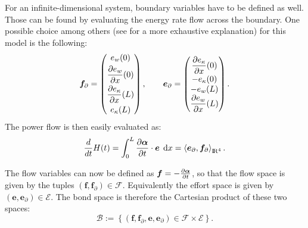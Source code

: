 \documentclass[11pt]{article}
\begin{document}
	For an infinite-dimensional system, boundary variables have to be defined as well. Those can be found by evaluating the energy rate flow across the boundary. One possible choice among others (see \cite{articleFlavio} for a more exhaustive explanation) for this model is the following:
	\begin{equation}
	\label{eq:BoundPortEB}
	\bm{f}_{\partial} = 
	\begin{pmatrix}
	e_w(0) \vspace{3pt} \\
	\displaystyle \diffp{e_{w}}{x}(0) \vspace{3pt}\\
	\displaystyle \diffp{e_{\kappa}}{x}(L) \vspace{3pt}\\
	e_{\kappa}(L) \\
	\end{pmatrix}, \qquad
	\bm{e}_{\partial} = 
	\begin{pmatrix}
	\displaystyle \diffp{e_{\kappa}}{x}(0) \vspace{1pt}\\
	-e_{\kappa}(0) \\
	-e_w(L) \\
	\displaystyle \diffp{e_{w}}{x}(L)\\
	\end{pmatrix}.
	\end{equation}
	The power flow is then easily evaluated as:
	\begin{equation}
	\frac{d}{dt} H(t) = \int_{0}^{L} \diffp{\bm{\alpha}}{t} \cdot \bm{e} \, \d{x} = \left\langle \bm{e}_{\partial}, \bm{f}_{\partial} \right\rangle_{{\rm I\!R}^4}.
	\end{equation}
	
	The flow variables can now be defined as $\bm{f} = - \diffp{\bm{\alpha}}{t}$, so that the flow space is given by the tuples
	$(\bm{f},\bm{f}_{\partial}) \in \mathcal{F}$. Equivalently the effort space is given by $(\bm{e},\bm{e}_{\partial}) \in \mathcal{E}$. The bond space is therefore the Cartesian product of these two spaces:
	\begin{equation}
	\label{eq:BondEB}
	\mathcal{B} := \left\{(\bm{f},\bm{f}_{\partial},\bm{e},\bm{e}_{\partial}) \in \mathcal{F} \times \mathcal{E} \right\}.
	\end{equation}
	
\end{document}

